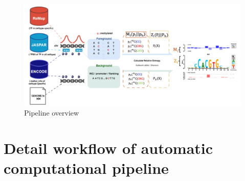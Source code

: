 \documentclass{PHlab-thesis}
\begin{document}
\begin{figure}[H]
	\centering
	\includegraphics[scale=0.5]{figures/OVERVIEW.png}
	\caption{Pipeline overview}
	\label{fig:overview} %
\end{figure}

\section[Automatic Computational Workflow]{Detail workflow of automatic computational pipeline}
\end{document}
